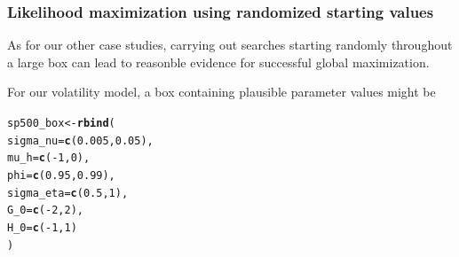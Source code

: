 \documentclass{beamer}\usepackage[]{graphicx}\usepackage[]{color}
\makeatletter
\newcommand{\hlnum}[1]{\textcolor[rgb]{0.686,0.059,0.569}{#1}}%
\newcommand{\hlopt}[1]{\textcolor[rgb]{0,0,0}{#1}}%
\newcommand{\hlstd}[1]{\textcolor[rgb]{0.345,0.345,0.345}{#1}}%
\newcommand{\hlkwb}[1]{\textcolor[rgb]{0.69,0.353,0.396}{#1}}%
\newcommand{\hlkwc}[1]{\textcolor[rgb]{0.333,0.667,0.333}{#1}}%
\newcommand{\hlkwd}[1]{\textcolor[rgb]{0.737,0.353,0.396}{\textbf{#1}}}%
\newenvironment{kframe}{%
 \def\at@end@of@kframe{}%
 \ifinner\ifhmode%
  \def\at@end@of@kframe{\end{minipage}}%
  \begin{minipage}{\columnwidth}%
 \fi\fi%
 \def\FrameCommand##1{\hskip\@totalleftmargin \hskip-\fboxsep
 \colorbox{shadecolor}{##1}\hskip-\fboxsep
     \hskip-\linewidth \hskip-\@totalleftmargin \hskip\columnwidth}%
 \MakeFramed {\advance\hsize-\width
   \@totalleftmargin\z@ \linewidth\hsize
   \@setminipage}}%
 {\par\unskip\endMakeFramed%
 \at@end@of@kframe}
\newenvironment{knitrout}{}{} %
\makeatother
\begin{document}
\begin{frame}[fragile]

\frametitle{Likelihood maximization using randomized starting values}

\bi

\item As for our other case studies, carrying out searches starting randomly throughout a large box can lead to reasonble evidence for successful global maximization.

\item For our volatility model, a box containing plausible parameter values might be

\ei

\begin{knitrout}\small
{}\color{fgcolor}\begin{kframe}
\begin{alltt}
\hlstd{sp500_box} \hlkwb{<-} \hlkwd{rbind}\hlstd{(}
 \hlkwc{sigma_nu}\hlstd{=}\hlkwd{c}\hlstd{(}\hlnum{0.005}\hlstd{,}\hlnum{0.05}\hlstd{),}
 \hlkwc{mu_h}    \hlstd{=}\hlkwd{c}\hlstd{(}\hlopt{-}\hlnum{1}\hlstd{,}\hlnum{0}\hlstd{),}
 \hlkwc{phi} \hlstd{=} \hlkwd{c}\hlstd{(}\hlnum{0.95}\hlstd{,}\hlnum{0.99}\hlstd{),}
 \hlkwc{sigma_eta} \hlstd{=} \hlkwd{c}\hlstd{(}\hlnum{0.5}\hlstd{,}\hlnum{1}\hlstd{),}
 \hlkwc{G_0} \hlstd{=} \hlkwd{c}\hlstd{(}\hlopt{-}\hlnum{2}\hlstd{,}\hlnum{2}\hlstd{),}
 \hlkwc{H_0} \hlstd{=} \hlkwd{c}\hlstd{(}\hlopt{-}\hlnum{1}\hlstd{,}\hlnum{1}\hlstd{)}
\hlstd{)}
\end{alltt}
\end{kframe}
\end{knitrout}

\end{frame}
\end{document}

